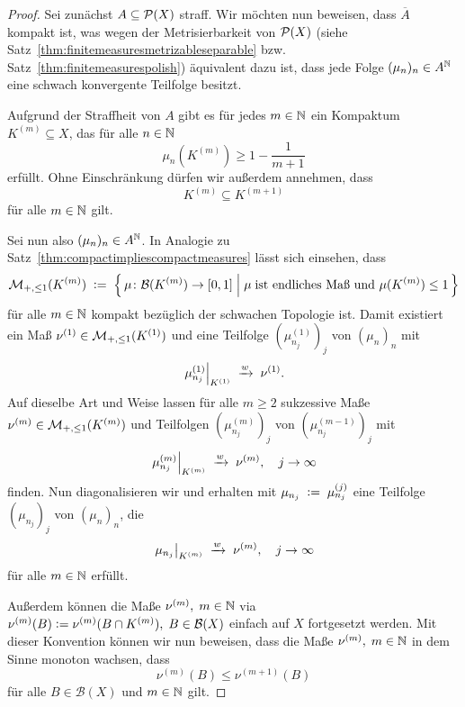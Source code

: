 \documentclass[../main/main.tex]{subfiles}
\begin{document}
	\begin{proof}
		Sei zunächst $A \subseteq \mathcal{P}(X)$ straff. Wir möchten nun beweisen, dass $\overline{A}$ 
		kompakt ist, was wegen der Metrisierbarkeit von $\mathcal{P}(X)$ (siehe Satz~\ref{thm:finitemeasuresmetrizableseparable} bzw. Satz~\ref{thm:finitemeasurespolish}) äquivalent dazu ist,
		dass jede Folge $(\mu_n)_n \in A^{\mathbb{N}}$ eine schwach konvergente Teilfolge besitzt. 
		
		Aufgrund der Straffheit von $A$ gibt es für jedes $m \in \mathbb{N}$ ein Kompaktum $K^{(m)} \subseteq X$, 
		das für alle $n \in \mathbb{N}$
		\[ \mu_n(K^{(m)}) \geq 1 - \frac{1}{m+1} \label{5.1} \tag{5.1} \]
		erfüllt. Ohne Einschränkung dürfen wir außerdem annehmen, dass 
		\[ K^{(m)} \subseteq K^{(m+1)} \label{5.2} \tag{5.2} \] 
		für alle $m \in \mathbb{N}$ gilt.
		
		Sei nun also $(\mu_n)_n \in A^{\mathbb{N}}$.
		In Analogie zu Satz~\ref{thm:compactimpliescompactmeasures} lässt sich einsehen, dass 
		\[ \mathcal{M}_{+,\leq 1}(K^{(m)}) \; \vcentcolon = \; \left\{\, \mu \colon \mathcal{B}(K^{(m)}) \to [0,1] \; \middle| \; \mu \; 
			\text{ist endliches Maß und } \mu(K^{(m)}) \leq 1 \,\right\} \]
		für alle $m \in \mathbb{N}$ kompakt bezüglich der schwachen Topologie ist. Damit existiert ein Maß 
		$\nu^{(1)} \in \mathcal{M}_{+,\leq 1}(K^{(1)})$ und eine Teilfolge $(\mu_{n_j}^{(1)})_j$ von $(\mu_n)_n$ mit
		\[ \left.\mu_{n_j}^{(1)}\right|_{K^{(1)}} \; \xrightarrow{w} \; \nu^{(1)} \text{.} \]
		Auf dieselbe Art und Weise lassen für alle $m\geq 2$ sukzessive Maße 
		$\nu^{(m)} \in \mathcal{M}_{+,\leq 1}(K^{(m)})$ und Teilfolgen $(\mu_{n_j}^{(m)})_j$ von $(\mu_{n_j}^{(m-1)})_j$ mit
		\[ \left.\mu_{n_j}^{(m)}\right|_{K^{(m)}} \; \xrightarrow{w} \; \nu^{(m)}, \quad j \to \infty \]
		finden.
		Nun diagonalisieren wir und erhalten mit $\mu_{n_j} \; \vcentcolon = \; \mu_{n_j}^{(j)}$ eine Teilfolge 
		$(\mu_{n_j})_j$ von $(\mu_n)_n$, die
		\[ \left.\mu_{n_j}\right|_{K^{(m)}} \; \xrightarrow{w} \; \nu^{(m)}, \quad j \to \infty \]
		für alle $m \in \mathbb{N}$ erfüllt.
		
		Außerdem können die Maße $\nu^{(m)}, \; m \in \mathbb{N}$ via 
		$\nu^{(m)}(B) \vcentcolon = \nu^{(m)}(B \cap K^{(m)}), \; B \in \mathcal{B}(X)$ einfach auf $X$ fortgesetzt werden. 
		Mit dieser Konvention können wir nun beweisen, dass die Maße
		$\nu^{(m)}, \; m \in \mathbb{N}$ in dem Sinne monoton wachsen, dass 
		\[ \nu^{(m)}(B) \leq \nu^{(m+1)}(B) \label{5.3} \tag{5.3} \]
		für alle $B \in \mathcal{B}(X)$ und $m \in \mathbb{N}$ gilt.
		

\end{proof}
\end{document}
